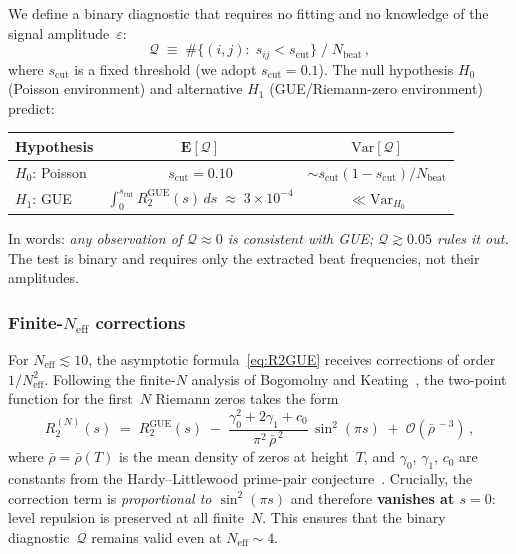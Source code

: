 \documentclass[12pt,a4paper]{article}
\begin{document}
We define a binary diagnostic that requires
no fitting and no knowledge of the signal amplitude~$\varepsilon$:
\begin{equation}\label{eq:Qstat}
  \mathcal{Q}
  \;\equiv\;
  \#\!\bigl\{(i,j):\; s_{ij} < s_{\mathrm{cut}}\bigr\}
  \;\Big/\;
  N_{\mathrm{beat}}\,,
\end{equation}
where $s_{\mathrm{cut}}$ is a fixed threshold
(we adopt $s_{\mathrm{cut}} = 0.1$).
The null hypothesis $H_0$ (Poisson environment)
and alternative $H_1$ (GUE/Riemann-zero environment)
predict:
\begin{center}
\renewcommand{\arraystretch}{1.3}
\begin{tabular}{lcc}
\hline
\textbf{Hypothesis} & $\mathbf{E}[\mathcal{Q}]$ & \textbf{$\mathrm{Var}[\mathcal{Q}]$}\\
\hline
$H_0$: Poisson   & $s_{\mathrm{cut}} = 0.10$
                  & $\sim s_{\mathrm{cut}}(1-s_{\mathrm{cut}})/N_{\mathrm{beat}}$ \\
$H_1$: GUE       & $\displaystyle\int_0^{s_{\mathrm{cut}}}
                     R_2^{\mathrm{GUE}}(s)\,ds
                     \;\approx\; 3\times 10^{-4}$
                  & $\ll \mathrm{Var}_{H_0}$ \\
\hline
\end{tabular}
\end{center}
In words: \emph{any observation of $\mathcal{Q}\approx 0$
is consistent with GUE; $\mathcal{Q}\gtrsim 0.05$ rules it out.}
The test is binary and requires only the extracted
beat frequencies, not their amplitudes.

\subsubsection{Finite-$N_{\mathrm{eff}}$ corrections}

For $N_{\mathrm{eff}} \lesssim 10$, the asymptotic
formula~\eqref{eq:R2GUE} receives corrections of order
$1/N_{\mathrm{eff}}^2$.  Following the finite-$N$ analysis
of Bogomolny and Keating~\cite{BogomolnyKeating1996},
the two-point function for the first~$N$ Riemann zeros
takes the form
\begin{equation}\label{eq:R2finite}
  R_2^{(N)}(s)
  \;=\;
  R_2^{\mathrm{GUE}}(s)
  \;-\;
  \frac{\gamma_0^2 + 2\gamma_1 + c_0}
       {\pi^2\,\bar\rho^{\,2}}\,
  \sin^2(\pi s)
  \;+\;
  \mathcal{O}(\bar\rho^{\,-3})\,,
\end{equation}
where $\bar\rho = \bar\rho(T)$ is the mean density of zeros
at height~$T$, and $\gamma_0$, $\gamma_1$, $c_0$ are
constants from the Hardy--Littlewood prime-pair
conjecture~\cite{BogomolnyKeating1996,Bogomolny2006}.
Crucially, the correction term is
\emph{proportional to $\sin^2(\pi s)$} and therefore
\textbf{vanishes at $s=0$}: level repulsion is preserved
at all finite~$N$.  This ensures that the binary
diagnostic~$\mathcal{Q}$ remains valid even at
$N_{\mathrm{eff}}\sim 4$.
\end{document}
